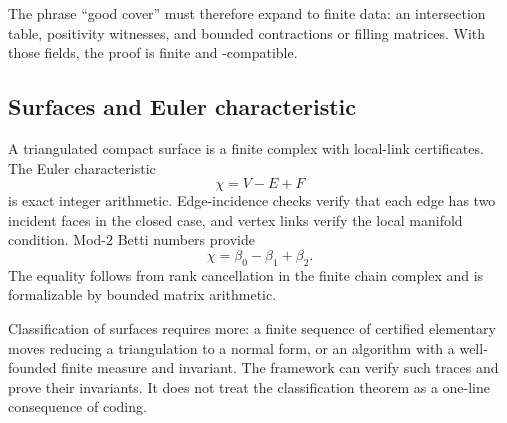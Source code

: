 The phrase ``good cover'' must therefore expand to finite data: an intersection table, positivity witnesses, and bounded contractions or filling matrices.  With those fields, the proof is finite and \ipra-compatible.

\subsection{Surfaces and Euler characteristic}

A triangulated compact surface is a finite complex with local-link certificates.  The Euler characteristic
\[
  \chi=V-E+F
\]
is exact integer arithmetic.  Edge-incidence checks verify that each edge has two incident faces in the closed case, and vertex links verify the local manifold condition.  Mod-$2$ Betti numbers provide
\[
  \chi=\beta_0-\beta_1+\beta_2.
\]
The equality follows from rank cancellation in the finite chain complex and is formalizable by bounded matrix arithmetic.

Classification of surfaces requires more: a finite sequence of certified elementary moves reducing a triangulation to a normal form, or an algorithm with a well-founded finite measure and invariant.  The framework can verify such traces and prove their invariants.  It does not treat the classification theorem as a one-line consequence of coding.
